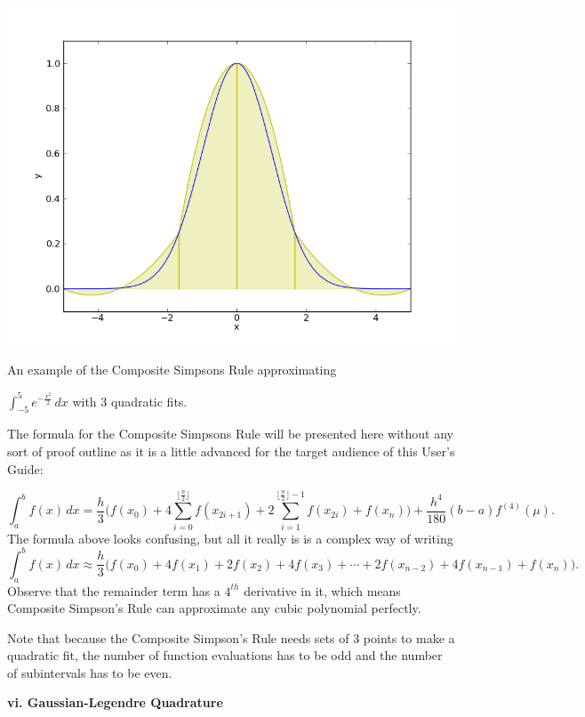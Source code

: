 \documentclass[12pt]{article}
\newcommand{\newLine}{\vspace{5mm}}
\newcommand{\nextsubsection}[1]{\newLine \noindent \large \textbf{#1} \normalsize}
\newcommand{\integral}[3]{\text{$\int^{#2}_{#1} #3\,dx$}}
\newcommand{\summation}[3]{\text{$\sum^{#2}_{#1} #3$}}
\newcommand{\floor}[1]{\text{$\lfloor#1\rfloor$}}
\begin{document}
\begin{center} \includegraphics[scale = 0.5]{gaussianSimpsons.png} 

\small An example of the Composite Simpsons Rule approximating 

$\integral{-5}{5}{e^{-\frac{x^2}{2}}}$ with 3 quadratic fits.\normalsize
\end{center}
The formula for the Composite Simpsons Rule will be presented here without any sort of proof outline as it is a little advanced for the target audience of this User's Guide:

\begin{equation*}  \integral{a}{b}{f(x)} = \frac{h}{3}\Big(f(x_0) + 4\summation{i=0}{\floor{\frac{n}{2}}}{f(x_{2i+1})} + 2\summation{i=1}{\floor{\frac{n}{2}}-1}{f(x_{2i})} + f(x_n)\Big) + \frac{h^4}{180}(b-a)f^{(4)}(\mu). 
\end{equation*}
The formula above looks confusing, but all it really is is a complex way of writing
\begin{equation*}  \integral{a}{b}{f(x)} \approx \frac{h}{3}\big(f(x_0) + 4f(x_1)+2f(x_2)+4f(x_3)+\cdots+2f(x_{n-2})+4f(x_{n-1})+f(x_n)\big).
\end{equation*}
Observe that the remainder term has a $4^{th}$ derivative in it, which means Composite Simpson's Rule can approximate any cubic polynomial perfectly.

Note that because the Composite Simpson's Rule needs sets of 3 points to make a quadratic fit, the number of function evaluations has to be odd and the number of subintervals has to be even.

\nextsubsection{vi. Gaussian-Legendre Quadrature}
\end{document}
